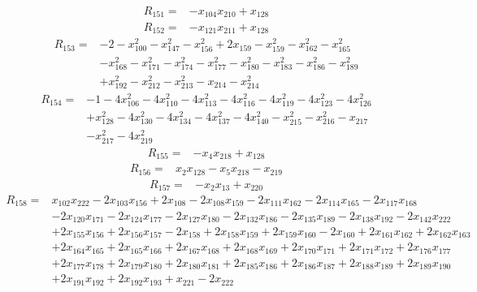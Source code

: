 \[
\begin{aligned}
R_{151}={}&-x_{104}x_{210}+x_{128}
\end{aligned}
\]
\[
\begin{aligned}
R_{152}={}&-x_{121}x_{211}+x_{128}
\end{aligned}
\]
\[
\begin{aligned}
R_{153}={}&-2-x_{100}^{2}-x_{147}^{2}-x_{156}^{2}+2x_{159}-x_{159}^{2}-x_{162}^{2}-x_{165}^{2}\\
&-x_{168}^{2}-x_{171}^{2}-x_{174}^{2}-x_{177}^{2}-x_{180}^{2}-x_{183}^{2}-x_{186}^{2}-x_{189}^{2}\\
&+x_{192}^{2}-x_{212}^{2}-x_{213}^{2}-x_{214}-x_{214}^{2}
\end{aligned}
\]
\[
\begin{aligned}
R_{154}={}&-1-4x_{106}^{2}-4x_{110}^{2}-4x_{113}^{2}-4x_{116}^{2}-4x_{119}^{2}-4x_{123}^{2}-4x_{126}^{2}\\
&+x_{128}^{2}-4x_{130}^{2}-4x_{134}^{2}-4x_{137}^{2}-4x_{140}^{2}-x_{215}^{2}-x_{216}^{2}-x_{217}\\
&-x_{217}^{2}-4x_{219}^{2}
\end{aligned}
\]
\[
\begin{aligned}
R_{155}={}&-x_{4}x_{218}+x_{128}
\end{aligned}
\]
\[
\begin{aligned}
R_{156}={}&x_{2}x_{128}-x_{5}x_{218}-x_{219}
\end{aligned}
\]
\[
\begin{aligned}
R_{157}={}&-x_{2}x_{13}+x_{220}
\end{aligned}
\]
\[
\begin{aligned}
R_{158}={}&x_{102}x_{222}-2x_{103}x_{156}+2x_{108}-2x_{108}x_{159}-2x_{111}x_{162}-2x_{114}x_{165}-2x_{117}x_{168}\\
&-2x_{120}x_{171}-2x_{124}x_{177}-2x_{127}x_{180}-2x_{132}x_{186}-2x_{135}x_{189}-2x_{138}x_{192}-2x_{142}x_{222}\\
&+2x_{155}x_{156}+2x_{156}x_{157}-2x_{158}+2x_{158}x_{159}+2x_{159}x_{160}-2x_{160}+2x_{161}x_{162}+2x_{162}x_{163}\\
&+2x_{164}x_{165}+2x_{165}x_{166}+2x_{167}x_{168}+2x_{168}x_{169}+2x_{170}x_{171}+2x_{171}x_{172}+2x_{176}x_{177}\\
&+2x_{177}x_{178}+2x_{179}x_{180}+2x_{180}x_{181}+2x_{185}x_{186}+2x_{186}x_{187}+2x_{188}x_{189}+2x_{189}x_{190}\\
&+2x_{191}x_{192}+2x_{192}x_{193}+x_{221}-2x_{222}
\end{aligned}
\]

